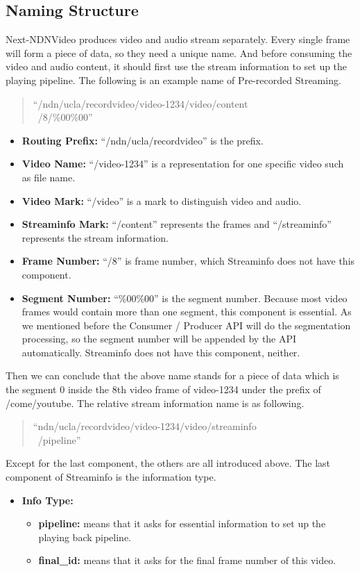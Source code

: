 \subsection{Naming Structure}
Next-NDNVideo produces video and audio stream separately. Every single frame will form a piece of data, so they need a unique name. And before consuming the video and audio content, it should first use the stream information to set up the playing pipeline. The following is an example name of Pre-recorded Streaming. 
\begin{quote}
``/ndn/ucla/recordvideo/video-1234/video/content \\\ /8/\%00\%00''
\end{quote}
\begin{itemize}
	\item{\textbf{Routing Prefix:}} ``/ndn/ucla/recordvideo'' is the prefix.
	\item{\textbf{Video Name:}} ``/video-1234'' is a representation for one specific video such as file name.
	\item{\textbf{Video Mark:}} ``/video'' is a mark to distinguish video and audio.
	\item{\textbf{Streaminfo Mark:}} ``/content'' represents the frames and ``/streaminfo'' represents the stream information.
	\item{\textbf{Frame Number:}} ``/8'' is frame number, which Streaminfo does not have this component.
	\item{\textbf{Segment Number:}} ``\%00\%00'' is the segment number. Because most video frames would contain more than one segment, this component is essential. As we mentioned before the Consumer / Producer API will do the segmentation processing, so the segment number will be appended by the API automatically. Streaminfo does not have this component, neither.
\end{itemize}

Then we can conclude that the above name stands for a piece of data which is the segment 0 inside the 8th video frame of video-1234 under the prefix of /come/youtube. The relative stream information name is as following.
\begin{quote}
``ndn/ucla/recordvideo/video-1234/video/streaminfo \\\ /pipeline''
\end{quote}

Except for the last component, the others are all introduced above. The last component of Streaminfo is the information type.
\begin{itemize}
	\item{\textbf{Info Type:}} 
	\begin{itemize}
		\item{\textbf{pipeline:}} means that it asks for essential information to set up the playing back pipeline. 
		\item{\textbf{final\_id:}} means that it asks for the final frame number of this video. 
	\end{itemize}
\end{itemize}



